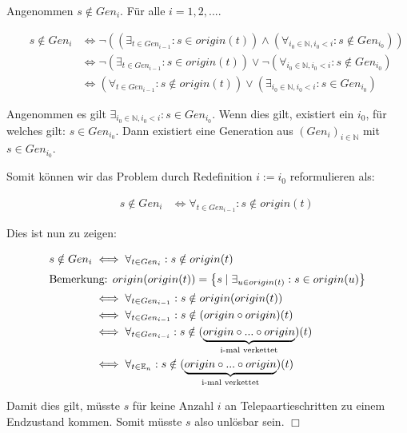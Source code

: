 \documentclass[a4paper,10pt,ngerman]{scrartcl}
\begin{document}
Angenommen \(s \notin Gen_{i}\). Für alle \(i=1,2,...\).

\begin{align*}
    &&s \notin Gen_{i} &\iff \lnot\left(\left(\exists_{t \in Gen_{i-1}} : s \in origin(t)\right) \land \left(\forall_{i_0\in\mathbb{N}, i_0 < i}: s \notin Gen_{i_0}\right)\right) \\
    && &\iff \lnot\left(\exists_{t \in Gen_{i-1}} : s \in origin(t)\right) \lor \lnot\left(\forall_{i_0\in\mathbb{N}, i_0 < i}: s \notin Gen_{i_0}\right) \\
    && &\iff \left(\forall_{t \in Gen_{i-1}} : s \notin origin(t)\right) \lor \left(\exists_{i_0\in\mathbb{N}, i_0 < i}: s \in Gen_{i_0}\right)
\end{align*}

Angenommen es gilt \(\exists_{i_0\in\mathbb{N}, i_0 < i}: s \in Gen_{i_0}\). Wenn dies gilt, existiert ein \(i_0\), für welches gilt: \(s \in Gen_{i_0}\). Dann existiert eine Generation aus \((Gen_i)_{i\in\mathbb{N}}\) mit \(s \in Gen_{i_0}\).

Somit können wir das Problem durch Redefinition \(i := i_0\) reformulieren als:

\begin{align*}
    &&s \notin Gen_{i} 
    &\iff \forall_{t \in Gen_{i-1}} : s \notin origin(t)
\end{align*}

Dies ist nun zu zeigen:

\begin{align*}
    s \notin Gen_{i}
    &\iff \forall_{t \in Gen_i} : s \notin origin(t) \\
    \intertext{Bemerkung: \(origin(origin(t)) = \left\{ s \mid \exists_{u \in origin(t)} : s \in origin(u) \right\}\)}
    &\iff \forall_{t \in Gen_{i-1}} : s \notin origin(origin(t)) \\
    &\iff \forall_{t \in Gen_{i-1}} : s \notin (origin \circ origin)(t) \\
    &\iff \forall_{t \in Gen_{i-i}} : s \notin (\underbrace{origin \circ ... \circ origin}_{\text{i-mal verkettet}})(t) \\
    &\iff \forall_{t \in \mathbb{E}_n} : s \notin (\underbrace{origin \circ ... \circ origin}_{\text{i-mal verkettet}})(t) \\
\end{align*}

Damit dies gilt, müsste \(s\) für keine Anzahl \(i\) an Telepaartieschritten zu einem Endzustand kommen. Somit müsste \(s\) also unlösbar sein. \(\Box\)
\end{document}
